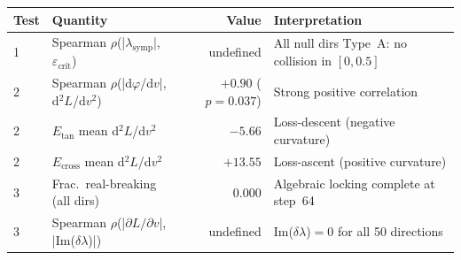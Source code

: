 \documentclass[11pt]{amsart}
\begin{document}
\begin{center}
\small
\begin{tabular}{@{}llrl@{}}
\toprule
Test & Quantity & Value & Interpretation \\
\midrule
1 & Spearman $\rho$(|$\lambda_\mathrm{symp}$|, $\varepsilon_\mathrm{crit}$)
  & undefined & All null dirs Type~A: no collision in $[0, 0.5]$ \\
2 & Spearman $\rho$(|d$\varphi$/d$v$|, d$^2L$/d$v^2$)
  & $+0.90$ ($p=0.037$) & Strong positive correlation \\
2 & $E_\mathrm{tan}$ mean d$^2L$/d$v^2$
  & $-5.66$ & Loss-descent (negative curvature) \\
2 & $E_\mathrm{cross}$ mean d$^2L$/d$v^2$
  & $+13.55$ & Loss-ascent (positive curvature) \\
3 & Frac.\ real-breaking (all dirs)
  & $0.000$ & Algebraic locking complete at step~64 \\
3 & Spearman $\rho$(|$\partial L/\partial v$|, |Im($\delta\lambda$)|)
  & undefined & Im($\delta\lambda$)$=0$ for all 50 directions \\
\bottomrule
\end{tabular}
\end{center}
\end{document}
